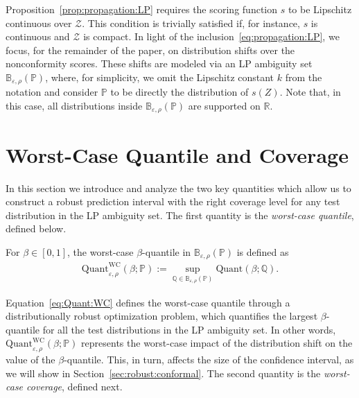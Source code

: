 \documentclass[11pt,a4paper]{article}
\begin{document}
Proposition~\ref{prop:propagation:LP} requires the scoring function $s$ to be Lipschitz continuous over $\mathcal{Z}$. This condition is trivially satisfied if, for instance, $s$ is continuous and $\mathcal{Z}$ is compact. In light of the inclusion~\eqref{eq:propagation:LP}, we focus, for the remainder of the paper, on distribution shifts over the nonconformity scores. These shifts are modeled via an LP ambiguity set $\mathbb{B}_{\varepsilon, \rho}(\mathbb{P})$, where, for simplicity, we omit the Lipschitz constant $k$ from the notation and consider $\mathbb P$ to be directly the distribution of $s(Z)$. Note that, in this case, all distributions inside $\mathbb{B}_{\varepsilon, \rho}(\mathbb{P})$ are supported on $\mathbb R$.











\section{Worst-Case Quantile and Coverage}
\label{sec:worst:case}

In this section we introduce and analyze the two key quantities which allow us to construct a robust prediction interval with the right coverage level for any test distribution in the LP ambiguity set. The first quantity is the \emph{worst-case quantile}, defined below.

\begin{definition}
\label{def:Quant:WC}
For $\beta \in [0,1]$, the worst-case $\beta$-quantile in $\mathbb{B}_{\varepsilon, \rho}(\mathbb P)$ is defined as
\begin{align}
\label{eq:Quant:WC}
    \text{Quant}_{\varepsilon,\rho}^{\text{WC}}(\beta;\mathbb P) := \sup_{\mathbb Q \in \mathbb{B}_{\varepsilon,\rho}(\mathbb P)} \text{Quant}(\beta;\mathbb Q).
\end{align}
\end{definition}

Equation~\eqref{eq:Quant:WC} defines the worst-case quantile through a distributionally robust optimization problem, which quantifies the largest $\beta$-quantile for all the test distributions in the LP ambiguity set. In other words, $\text{Quant}_{\varepsilon,\rho}^{\text{WC}}(\beta;\mathbb P)$ represents the worst-case impact of the distribution shift on the value of the $\beta$-quantile. This, in turn, affects the size of the confidence interval, as we will show in Section~\ref{sec:robust:conformal}. The second quantity is the \emph{worst-case coverage}, defined next.
\end{document}
